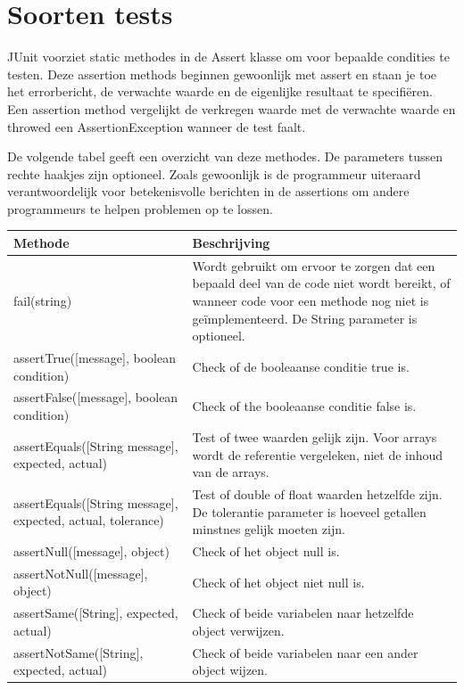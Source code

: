 \documentclass{book}
\begin{document}
\section{Soorten tests}

JUnit voorziet static methodes in de Assert klasse om voor bepaalde condities te testen. Deze assertion methods beginnen gewoonlijk met assert en staan je toe het errorbericht, de verwachte waarde en de eigenlijke resultaat te specifiëren. Een assertion method vergelijkt de verkregen waarde met de verwachte waarde en throwed een AssertionException wanneer de test faalt.

De volgende tabel geeft een overzicht van deze methodes. De parameters tussen rechte haakjes zijn optioneel. Zoals gewoonlijk is de programmeur uiteraard verantwoordelijk voor betekenisvolle berichten in de assertions om andere programmeurs te helpen problemen op te lossen.

\begin{center}
    \begin{tabularx}{\textwidth}{|X|X|}
    \hline
    Methode & Beschrijving \\ \hline
    fail(string) & Wordt gebruikt om ervoor te zorgen dat een bepaald deel van de code niet wordt bereikt, of wanneer code voor een methode nog niet is geïmplementeerd. De String parameter is optioneel. \\ \hline
    assertTrue([message], boolean condition) & Check of de booleaanse conditie true is. \\ \hline
    assertFalse([message], boolean condition) & Check of the booleaanse conditie false is. \\ \hline
    assertEquals([String message], expected, actual) & Test of twee waarden gelijk zijn. Voor arrays wordt de referentie vergeleken, niet de inhoud van de arrays. \\ \hline
    assertEquals([String message], expected, actual, tolerance) & Test of double of float waarden hetzelfde zijn. De tolerantie parameter is hoeveel getallen minstnes gelijk moeten zijn. \\ \hline
    assertNull([message], object) & Check of het object null is. \\ \hline
    assertNotNull([message], object) & Check of het object niet null is. \\ \hline
    assertSame([String], expected, actual) & Check of beide variabelen naar hetzelfde object verwijzen. \\ \hline
    assertNotSame([String], expected, actual) & Check of beide variabelen naar een ander object wijzen. \\ \hline

    \end{tabularx}
\end{center}
\end{document}
